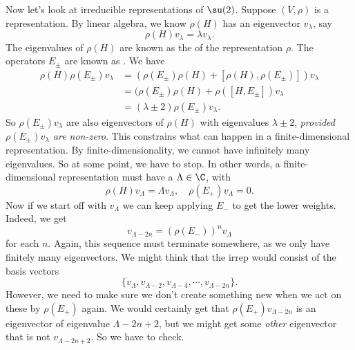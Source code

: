 \documentclass[a4paper]{article}
\begin{document}
Now let's look at irreducible representations of $\su(2)$. Suppose $(V, \rho)$ is a representation. By linear algebra, we know $\rho(H)$ has an eigenvector $v_\lambda$, say
\[
  \rho(H) v_\lambda = \lambda v_\lambda.
\]
The eigenvalues of $\rho(H)$ are known as the  of the representation $\rho$. The operators $E_{\pm}$ are known as . We have
\begin{align*}
  \rho(H) \rho(E_{\pm}) v_\lambda &= (\rho(E_{\pm})\rho(H) + [\rho(H), \rho(E_{\pm})])v_\lambda \\
  &= (\rho(E_{\pm})\rho(H) + \rho([H, E_{\pm}]) v_\lambda \\
  &= (\lambda \pm 2) \rho(E_{\pm}) v_\lambda.
\end{align*}
So $\rho(E_{\pm}) v_\lambda$ are also eigenvectors of $\rho(H)$ with eigenvalues $\lambda \pm 2$, \emph{provided $\rho(E_{\pm})v_\lambda$ are non-zero}. This constrains what can happen in a finite-dimensional representation. By finite-dimensionality, we cannot have infinitely many eigenvalues. So at some point, we have to stop. In other words, a finite-dimensional representation must have a  $\Lambda \in \C$, with
\[
  \rho(H)v_\Lambda = \Lambda v_\Lambda,\quad \rho(E_+) v_\Lambda = 0.
\]
Now if we start off with $v_\Lambda$ we can keep applying $E_-$ to get the lower weights. Indeed, we get
\[
  v_{\Lambda - 2n} = (\rho(E_-))^n v_\Lambda
\]
for each $n$. Again, this sequence must terminate somewhere, as we only have finitely many eigenvectors. We might think that the irrep would consist of the basis vectors
\[
  \{v_\Lambda, v_{\Lambda - 2}, v_{\Lambda - 4}, \cdots, v_{\Lambda - 2n}\}.
\]
However, we need to make sure we don't create something new when we act on these by $\rho(E_+)$ again. We would certainly get that $\rho(E_+)v_{\Lambda - 2n}$ is an eigenvector of eigenvalue $\Lambda - 2n + 2$, but we might get some \emph{other} eigenvector that is not $v_{\Lambda - 2n + 2}$. So we have to check.
\end{document}
